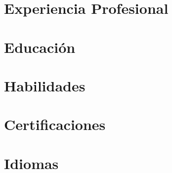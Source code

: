 \documentclass[10pt,a4paper]{article}
\begin{document}




\section*{Experiencia Profesional}
\vspace{-0.5em}


\vspace{-0.5em}
\section*{Educación}
\vspace{-0.5em}


\vspace{-0.5em}
\section*{Habilidades}
\vspace{-0.5em}


\vspace{-0.5em}
\section*{Certificaciones}
\vspace{-0.5em}


\vspace{-0.5em}
\section*{Idiomas}
\vspace{-0.5em}


\vspace{-0.5em}

\end{document}
